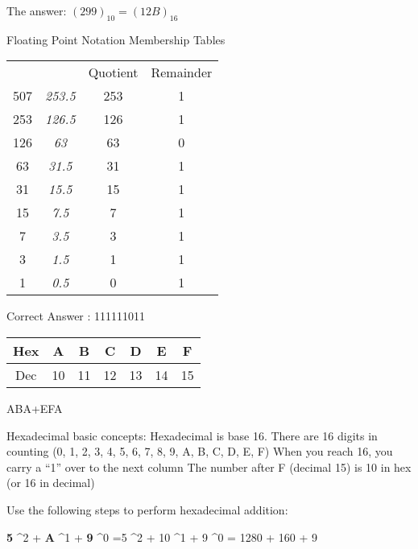 The answer: $(299)_{10} = (12B)_{16}$




Floating Point Notation
Membership Tables



\begin{tabular}{|c|c|c|c|}
	&		&	Quotient	&	Remainder	\\
507	&\emph{	253.5	}&	253	&	1	\\
253	&\emph{	126.5	}&	126	&	1	\\
126	&\emph{	63	}&	63	&	0	\\
63	&\emph{	31.5	}&	31	&	1	\\
31	&\emph{	15.5	}&	15	&	1	\\
15	&\emph{	7.5	}&	7	&	1	\\
7	&\emph{	3.5	}&	3	&	1	\\
3	&\emph{	1.5	}&	1	&	1	\\
1	&\emph{	0.5	}&	0	&	1	\\
\end{tabular} 

Correct Answer : 111111011


\begin{tabular}{|c||c|c|c|c|c|c|}
\hline Hex & A & B  & C & D & E & F \\  \hline
\hline Dec & 10 & 11 & 12 & 13  &14  &15  \\  \hline
\hline 
\end{tabular} 

ABA+EFA

Hexadecimal basic concepts:	
Hexadecimal is base 16.  
There are 16 digits in counting (0, 1, 2, 3, 4, 5, 6, 7, 8, 9, A, B, C, D, E, F)
When you reach 16, you carry a “1” over to the next column
The number after F (decimal 15) is 10 in hex (or 16 in decimal)

Use the following steps to perform hexadecimal addition:


\textbf{5} ^2 + \textbf{A} ^1  + \textbf{9} ^0
=5 ^2 + 10 ^1  + 9 ^0
= 1280 + 160 + 9

